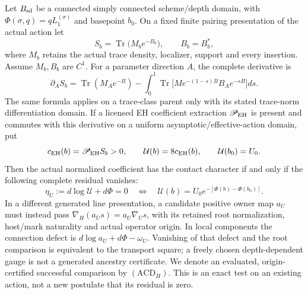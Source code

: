 \documentclass[12pt,a4paper]{article}
\begin{document}
\begin{theorem}
\label{p3b:thm:v2211-action-contact-certificate}
Let $B_{\rm sd}$ be a connected simply connected scheme/depth domain, with
$\Phi(\sigma,q)=qL_1^{(\sigma)}$ and basepoint $b_0$. On a fixed finite
pairing presentation of the actual action let
\[
 S_b=\operatorname{Tr}\bigl(M_b e^{-B_b}\bigr),\qquad B_b=B_b^*,
\]
where $M_b$ retains the actual trace density, localizer, support and every
insertion. Assume $M_b,B_b$ are $C^1$. For a parameter direction $A$, the
complete derivative is
\begin{equation}
\label{p3b:eq:v2211-complete-action-duhamel}
 \boxed{\partial_A S_b=
 \operatorname{Tr}(M_Ae^{-B})
 -\int_0^1\operatorname{Tr}\bigl[
 M e^{-(1-s)B}B_Ae^{-sB}\bigr]ds.}
\end{equation}
The same formula applies on a trace-class parent only with its stated
trace-norm differentiation domain. If a licensed EH coefficient extraction
$\mathscr P_{\rm EH}$ is present and commutes with this derivative on a
uniform asymptotic/effective-action domain, put
\[
 c_{\rm EH}(b)=\mathscr P_{\rm EH}S_b>0,\qquad
 \mathcal U(b)=8c_{\rm EH}(b),\qquad \mathcal U(b_0)=U_0.
\]
Then the actual normalized coefficient has the contact character if and
only if the following complete residual vanishes:
\begin{equation}
\label{p3b:eq:v2211-action-contact-residual}
 \boxed{\eta_U:=d\log\mathcal U+d\Phi=0
 \quad\Longleftrightarrow\quad
 \mathcal U(b)=U_0e^{-[\Phi(b)-\Phi(b_0)]}.}
\end{equation}
In a different generated line presentation, a candidate positive owner map
$a_U$ must instead pass
$\nabla_H(a_Us)=a_U\nabla_Us$, with its retained root normalization,
host/mark naturality and actual operator origin. In local components the
connection defect is $d\log a_U+d\Phi-\omega_U$. Vanishing of that defect
and the root comparison is equivalent to the transport square; a freely
chosen depth-dependent gauge is not a generated ancestry certificate.
We denote an evaluated, origin-certified successful comparison by
$(\mathrm{ACD}_H)$. This is an exact test on an existing action, not a new
postulate that its residual is zero.
\end{theorem}
\end{document}
